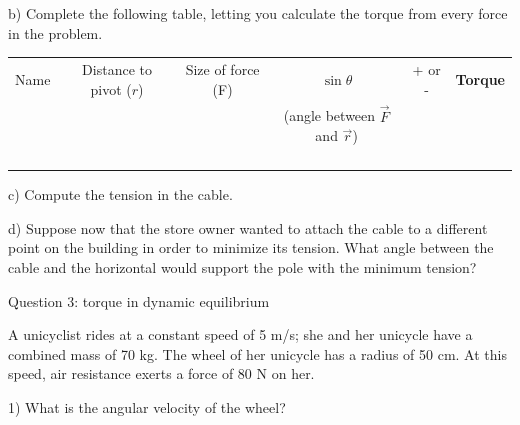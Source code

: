 \documentclass[12pt]{article}
\begin{document}
\begin{landscape}

b) Complete the following table, letting you calculate the torque from every force in the problem. 

\Large
\begin{center}
\begin{tabular}{|c|c|c|c|c|c|}
\hline
Name & Distance to pivot ($r$) & Size of force (F) & $\sin \theta$ & + or - & {\bf Torque} \\
     & & & (angle between $\vec F$ and $\vec r$) & & \\\hline
              &                         &                        &                                              &                    &                               \\ \hline
              &                         &                        &                                              &                    &                               \\ \hline
              &                         &                        &                                              &                    &                               \\ \hline
              &                         &                        &                                              &                    &                               \\ \hline
\end{tabular}
\end{center}
\normalsize
c) Compute the tension in the cable.

\vspace{3 in}

d) Suppose now that the store owner wanted to attach the cable to a different point on the building in order to minimize its tension. What angle between the
cable and the horizontal would support the pole with the minimum tension?
\end{landscape} \newpage


\newpage

\centerline{\large Question 3: torque in dynamic equilibrium}

A unicyclist rides at a constant speed of 5 m/s; she and her unicycle have a combined mass of 70 kg. The wheel of her unicycle has a radius of 50 cm. At this speed, air resistance exerts a force of 80 N on her.


1) What is the angular velocity of the wheel?
\vspace{1.2in}
\end{document}
